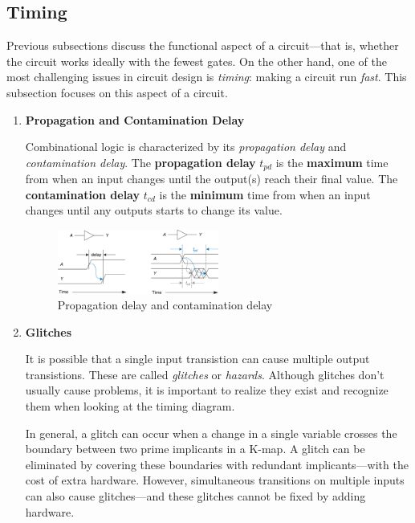 \documentclass[12pt]{article}
\begin{document}
\subsection{Timing}

Previous subsections discuss the functional aspect of a circuit---that is, whether the circuit works ideally with the fewest gates. On the other hand, one of the most challenging issues in circuit design is \textit{timing}: making a circuit run \textit{fast}. This subsection focuses on this aspect of a circuit.

\begin{enumerate}
  \item \textbf{Propagation and Contamination Delay}

  Combinational logic is characterized by its \textit{propagation delay} and \textit{contamination delay}. The \textbf{propagation delay} $t_{pd}$ is the \textbf{maximum} time from when an input changes until the output(s) reach their final value. The \textbf{contamination delay} $t_{cd}$ is the \textbf{minimum} time from when an input changes until any outputs starts to change its value.

  \begin{figure}[h]
    \centering
    \includegraphics[width=0.5\textwidth]{propagation_contamination_delay.png}
    \caption{Propagation delay and contamination delay}
    \label{figure:8}
  \end{figure}

  \item \textbf{Glitches}

  It is possible that a single input transistion can cause multiple output transistions. These are called \textit{glitches} or \textit{hazards}. Although glitches don't usually cause problems, it is important to realize they exist and recognize them when looking at the timing diagram.

  In general, a glitch can occur when a change in a single variable crosses the boundary between two prime implicants in a K-map. A glitch can be eliminated by covering these boundaries with redundant implicants---with the cost of extra hardware. However, simultaneous transitions on multiple inputs can also cause glitches---and these glitches cannot be fixed by adding hardware.
\end{enumerate}
\end{document}
